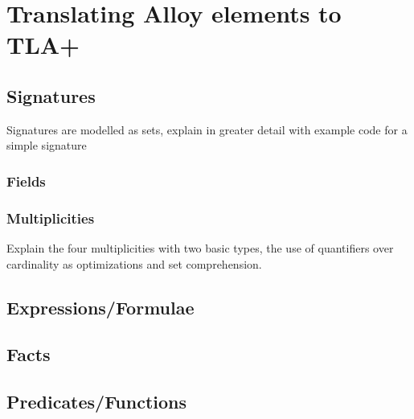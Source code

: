 \chapter{Translating Alloy elements to TLA+}



\section{Signatures}

Signatures are modelled as sets, explain in greater detail with example code for a simple signature

\subsection{Fields}

\subsection{Multiplicities}

Explain the four multiplicities with two basic types, the use of quantifiers over cardinality as optimizations and set comprehension.

\section{Expressions/Formulae}

\section{Facts}

\section{Predicates/Functions}





